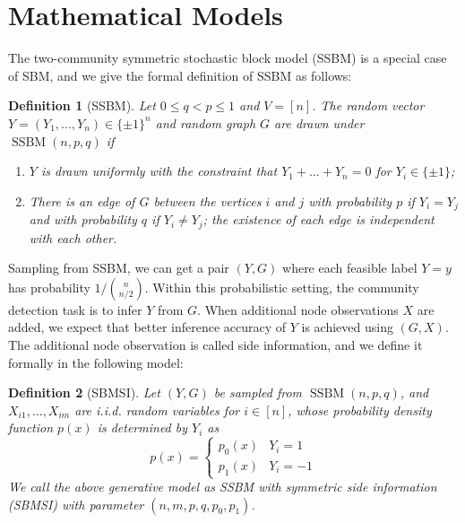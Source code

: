 \documentclass[conference,letterpaper]{IEEEtran}
\newtheorem{definition}{Definition}
\DeclareMathOperator{\SSBM}{SSBM}
\DeclareMathOperator{\Bern}{Bern}
\begin{document}
\section{Mathematical Models}\label{s:model}
The two-community symmetric stochastic block model (SSBM) is a special case of SBM, and we give the formal definition of SSBM as follows:
\begin{definition}[SSBM]
	Let $0\leq q<p\leq 1$ and $V=[n]$. The random vector $Y=(Y_1,\dots,Y_n)\in \{\pm 1\}^n$ and random graph $G$ are drawn under $\SSBM(n,p,q)$ if
	\begin{enumerate}
		\item $Y$ is drawn uniformly with the constraint that $Y_1 + \dots  + Y_n = 0$ for $Y_i \in \{\pm 1 \}$;
		
		\item There is an edge of $G$ between the vertices $i$ and $j$ with probability $p$ if $Y_i=Y_j$ and with probability $q$ if $Y_i \neq Y_j$; the existence of each edge is independent with each other.
	\end{enumerate}
\end{definition}
Sampling from SSBM, we can get a pair $(Y,G)$ where each feasible label $Y=y$ has probability $ 1/ \binom{n}{n/2}$.
Within this probabilistic setting, the community detection task is to infer $Y$ from $G$.
When
additional node observations $X$ are added, we expect that better inference accuracy of $Y$ is achieved using $(G,X)$.
The additional node observation is called side information, and we define it formally in the following model:
\begin{definition}[SBMSI]
	Let $(Y,G)$ be sampled from
	$\SSBM(n,p,q)$, and $X_{i1}, \dots, X_{im}$ are i.i.d. random variables for $i \in [n]$,
	whose probability density function $p(x)$ is determined by $Y_i$ as
	\begin{equation}
	p(x) = \begin{cases}
	p_0(x) & Y_i = 1 \\
	p_1(x) & Y_i = -1
	\end{cases}
	\end{equation}
	We call the above generative model as SSBM with symmetric side information (SBMSI) with parameter $(n,m,p,q,p_0,p_1)$.
\end{definition}
\end{document}
